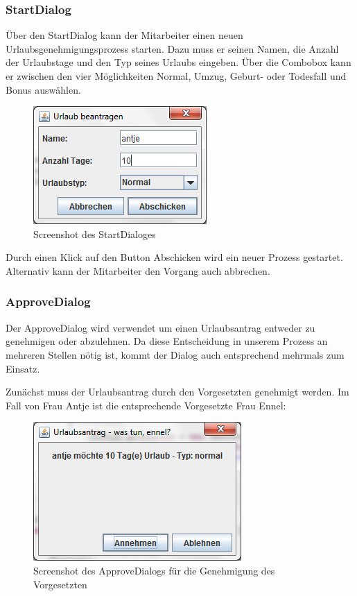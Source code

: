 \subsubsection{StartDialog}
Über den StartDialog kann der Mitarbeiter einen neuen Urlaubsgenehmigungsprozess starten. Dazu muss er seinen Namen, die Anzahl der Urlaubstage und den Typ seines Urlaubs eingeben. Über die Combobox kann er zwischen den vier Möglichkeiten Normal, Umzug, Geburt- oder Todesfall und Bonus auswählen.

\begin{figure}[H]
	\centering
	\includegraphics[width=0.4\linewidth]{Bilder/DialogUrlaubBeantragen}
	\caption{Screenshot des StartDialoges}
	\label{fig:DialogUrlaubBeantragen}
\end{figure}

Durch einen Klick auf den Button Abschicken wird ein neuer Prozess gestartet. Alternativ kann der Mitarbeiter den Vorgang auch abbrechen.

\subsubsection{ApproveDialog}
Der ApproveDialog wird verwendet um einen Urlaubsantrag entweder zu genehmigen oder abzulehnen. Da diese Entscheidung in unserem Prozess an mehreren Stellen nötig ist, kommt der Dialog auch entsprechend mehrmals zum Einsatz.

Zunächst muss der Urlaubsantrag durch den Vorgesetzten genehmigt werden. Im Fall von Frau Antje ist die entsprechende Vorgesetzte Frau Ennel:

\begin{figure}[H]
	\centering
	\includegraphics[width=0.5\linewidth]{Bilder/DialogVorgesetzteGenehmigung}
	\caption{Screenshot des ApproveDialogs für die Genehmigung des Vorgesetzten}
	\label{fig:DialogVorgesetzteGenehmigung}
\end{figure}

